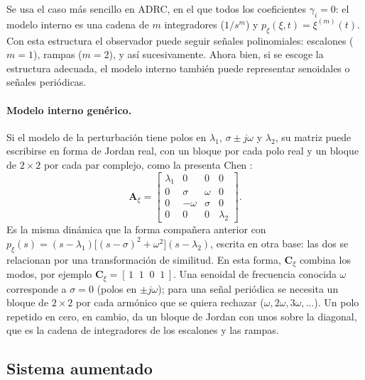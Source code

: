 Se usa el caso más sencillo en ADRC, en el que todos los
coeficientes $\gamma_i = 0$: el modelo interno es una cadena de $m$ integradores
($1/s^{m}$) y $p_{\xi}(\xi,t) = \xi^{(m)}(t)$. Con esta estructura el observador puede seguir
señales polinomiales: escalones ($m = 1$), rampas ($m = 2$), y así
sucesivamente. Ahora bien, si se escoge la estructura adecuada, el modelo interno
también puede representar senoidales o señales periódicas.

\paragraph{Modelo interno genérico.} Si el modelo de la perturbación tiene polos
en $\lambda_1$, $\sigma \pm j\omega$ y $\lambda_2$, su matriz puede escribirse en
forma de Jordan real, con un bloque por cada polo real y un bloque de
$2 \times 2$ por cada par complejo, como la presenta Chen
\cite[sec.~4.3.1]{chen1999linear}:
\begin{equation}
\mathbf{A}_{\xi} =
\begin{bmatrix}
\lambda_1 & 0 & 0 & 0 \\
0 & \sigma & \omega & 0 \\
0 & -\omega & \sigma & 0 \\
0 & 0 & 0 & \lambda_2
\end{bmatrix}.
\label{eq:modelo_interno_jordan}
\end{equation}
Es la misma dinámica que la forma compañera anterior con
$p_{\xi}(s) = (s - \lambda_1)\bigl[(s - \sigma)^2 + \omega^2\bigr](s - \lambda_2)$,
escrita en otra base: las dos se relacionan por una transformación de similitud.
En esta forma, $\mathbf{C}_{\xi}$ combina los modos, por ejemplo
$\mathbf{C}_{\xi} = [\,1 \;\; 1 \;\; 0 \;\; 1\,]$. Una senoidal de frecuencia
conocida $\omega$ corresponde a $\sigma = 0$ (polos en $\pm j\omega$); para una
señal periódica se necesita un bloque de $2 \times 2$ por cada armónico que se
quiera rechazar ($\omega, 2\omega, 3\omega, \dots$). Un polo repetido en cero, en cambio, da un
bloque de Jordan con unos sobre la diagonal, que es la cadena de integradores de
los escalones y las rampas. 

 
\subsection{Sistema aumentado}
\label{subsec:aumentado}

